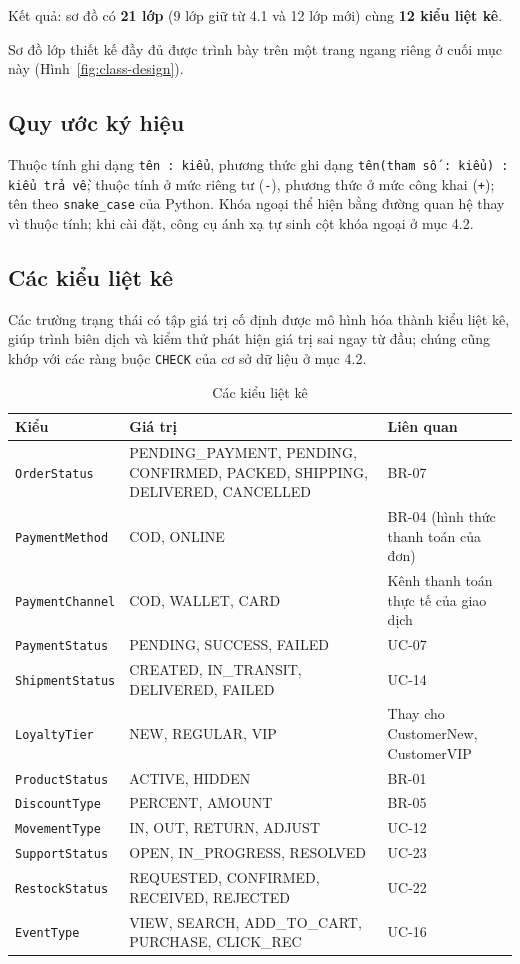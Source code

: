 \documentclass[12pt,a4paper,oneside]{report}
\begin{document}
Kết quả: sơ đồ có \textbf{21 lớp} (9 lớp giữ từ 4.1 và 12 lớp mới) cùng \textbf{12 kiểu liệt kê}.

Sơ đồ lớp thiết kế đầy đủ được trình bày trên một trang ngang riêng ở cuối mục này (Hình~\ref{fig:class-design}).

\subsection{Quy ước ký hiệu}

Thuộc tính ghi dạng \texttt{tên : kiểu}, phương thức ghi dạng \texttt{tên(tham số : kiểu) : kiểu trả về}; thuộc tính ở mức riêng tư (\texttt{-}), phương thức ở mức công khai (\texttt{+}); tên theo \texttt{snake\_case} của Python. Khóa ngoại thể hiện bằng đường quan hệ thay vì thuộc tính; khi cài đặt, công cụ ánh xạ tự sinh cột khóa ngoại ở mục 4.2.

\subsection{Các kiểu liệt kê}

Các trường trạng thái có tập giá trị cố định được mô hình hóa thành kiểu liệt kê, giúp trình biên dịch và kiểm thử phát hiện giá trị sai ngay từ đầu; chúng cũng khớp với các ràng buộc \texttt{CHECK} của cơ sở dữ liệu ở mục 4.2.

\begin{longtable}{p{3.4cm}p{7.4cm}p{5cm}}
\caption{Các kiểu liệt kê}\\
\toprule
\textbf{Kiểu} & \textbf{Giá trị} & \textbf{Liên quan} \\
\midrule
\endhead
\bottomrule
\endlastfoot
\texttt{OrderStatus} & PENDING\_PAYMENT, PENDING, CONFIRMED, PACKED, SHIPPING, DELIVERED, CANCELLED & BR-07 \\
\texttt{PaymentMethod} & COD, ONLINE & BR-04 (hình thức thanh toán của đơn) \\
\texttt{PaymentChannel} & COD, WALLET, CARD & Kênh thanh toán thực tế của giao dịch \\
\texttt{PaymentStatus} & PENDING, SUCCESS, FAILED & UC-07 \\
\texttt{ShipmentStatus} & CREATED, IN\_TRANSIT, DELIVERED, FAILED & UC-14 \\
\texttt{LoyaltyTier} & NEW, REGULAR, VIP & Thay cho CustomerNew, CustomerVIP \\
\texttt{ProductStatus} & ACTIVE, HIDDEN & BR-01 \\
\texttt{DiscountType} & PERCENT, AMOUNT & BR-05 \\
\texttt{MovementType} & IN, OUT, RETURN, ADJUST & UC-12 \\
\texttt{SupportStatus} & OPEN, IN\_PROGRESS, RESOLVED & UC-23 \\
\texttt{RestockStatus} & REQUESTED, CONFIRMED, RECEIVED, REJECTED & UC-22 \\
\texttt{EventType} & VIEW, SEARCH, ADD\_TO\_CART, PURCHASE, CLICK\_REC & UC-16 \\
\end{longtable}
\end{document}

